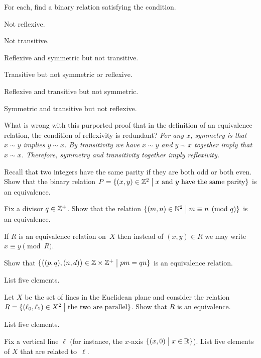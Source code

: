 \documentclass{ibl}
\begin{document}
\begin{ex} For each, find a binary relation satisfying the condition.
\begin{exes}
\item Not reflexive.
\item Not transitive.
\item Reflexive and symmetric but not transitive.
\item Transitive but not symmetric or reflexive.
\item Reflexive and transitive but not symmetric.
\item Symmetric and transitive but not reflexive. 
\end{exes}
\end{ex}

\begin{ex}
What is wrong with this purported proof that in the definition
of an equivalence relation, the condition of reflexivity is redundant?
\textit{For any $x$, symmetry is that $x∼y$ implies $y∼x$.
By transitivity we have $x∼y$ and $y∼x$ together imply that $x∼x$. 
Therefore, symmetry and transitivity together imply reflexivity.}  
\end{ex}

\begin{ex}
Recall that two integers have the same parity if they are both odd or 
both even.
Show that the binary relation 
$P=\{(x,y)\in\mathbb{Z}^2 \bigm| \text{$x$ and $y$ have the same parity}\}$  
is an equivalence.
\end{ex}

\begin{ex}
Fix a divisor $q\in\mathbb{Z}^+$.
Show that the relation 
$\{(m,n)\in\mathbb{N}^2 \bigm| m\equiv n\pmod q\}$  
is an equivalence.
\end{ex}

\begin{df}
If $R$ is an equivalence relation on~$X$ then instead of $(x,y)\in R$
we may write $x\equiv y\pmod R$.  
\end{df}

\begin{ex} \label{RationalsAsEqClasses}
\begin{exes}
\item Show that 
$\{\big((p,q),(n,d)\big)\in \mathbb{Z}\times\mathbb{Z}^+ \bigm| pm=qn\}$
is an equivalence relation.
\item List five elements.
\end{exes}
\end{ex}

\begin{ex} \label{PlaneLinesAsClasses}
\begin{exes}
\item Let $X$ be the set of lines in the Euclidean plane and consider
the relation
$R=\{(\ell_0,\ell_1)\in X^2 \bigm| \text{the two are parallel}\}$. 
Show that $R$ is an equivalence.
\item List five elements.
\item Fix a vertical line $\ell$ (for instance, the $x$-axis 
  $\{(x,0) \bigm| x\in\mathbb{R}\}$).
  List five elements of $X$ that are related to~$\ell$.
\end{exes}
\end{ex}
\end{document}
